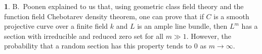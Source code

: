 \documentclass{amsart}
\theoremstyle{definition}
\newtheorem{say}[thm]{}
\theoremstyle{remark}
\newcommand{\qtq}[1]{\quad\mbox{#1}\quad}
\newcommand{\tsum}[0]{\textstyle{\sum}}
\begin{document}




\begin{say}\label{poonen.letter.say}
B.~Poonen explained to us that, using geometric class field
theory
and the function field Chebotarev density theorem, one can prove that if $C$ is a smooth projective curve over a finite field $k$ and $L$ is an ample line bundle, then $L^m$ has a section with irreducible and reduced zero set for all $m\gg 1$.  However, the probability that a random section 
has this property tends to 0 as $m \to\infty$.
\end{say}
\end{document}
